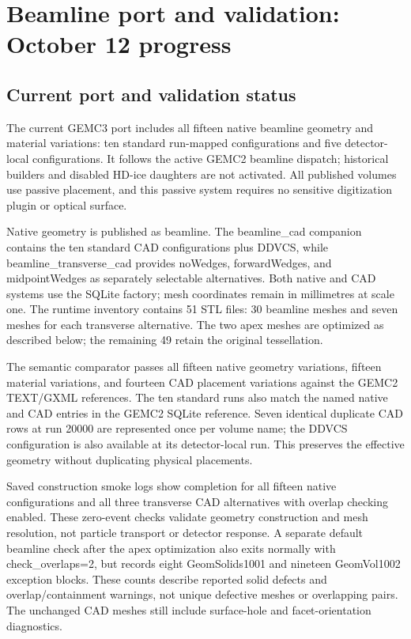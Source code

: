 \FloatBarrier
\section{Beamline port and validation: October 12 progress}

\subsection{Current port and validation status}

The current GEMC3 port includes all fifteen native beamline geometry and material variations: ten
standard run-mapped configurations and five detector-local configurations. It follows the active GEMC2
beamline dispatch; historical builders and disabled HD-ice daughters are not activated. All published
volumes use passive placement, and this passive system requires no sensitive digitization plugin or
optical surface.

Native geometry is published as beamline. The beamline\_cad companion contains the ten standard CAD
configurations plus DDVCS, while beamline\_transverse\_cad provides noWedges, forwardWedges, and
midpointWedges as separately selectable alternatives. Both native and CAD systems use the SQLite factory;
mesh coordinates remain in millimetres at scale one. The runtime inventory contains 51 STL files: 30
beamline meshes and seven meshes for each transverse alternative. The two apex meshes are optimized as
described below; the remaining 49 retain the original tessellation.

The semantic comparator passes all fifteen native geometry variations, fifteen material variations, and
fourteen CAD placement variations against the GEMC2 TEXT/GXML references. The ten standard runs also
match the named native and CAD entries in the GEMC2 SQLite reference. Seven identical duplicate CAD rows
at run 20000 are represented once per volume name; the DDVCS configuration is also available at its
detector-local run. This preserves the effective geometry without duplicating physical placements.

Saved construction smoke logs show completion for all fifteen native configurations and all three
transverse CAD alternatives with overlap checking enabled. These zero-event checks validate geometry
construction and mesh resolution, not particle transport or detector response. A separate default
beamline check after the apex optimization also exits normally with check\_overlaps=2, but records eight
GeomSolids1001 and nineteen GeomVol1002 exception blocks. These counts describe reported solid defects
and overlap/containment warnings, not unique defective meshes or overlapping pairs. The unchanged CAD
meshes still include surface-hole and facet-orientation diagnostics.

